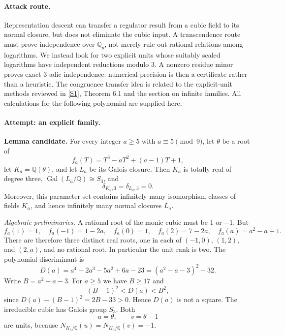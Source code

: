 \documentclass[11pt,a4paper]{article}
\newcommand{\Q}{\mathbb{Q}}
\newcommand{\sref}[2]{\hyperlink{source:#1:#2}{[S#2]}}
\numberwithin{equation}{section}
\begin{document}
\paragraph{Attack route.}
Representation descent can transfer a regulator result from a cubic field
to its normal closure, but does not eliminate the cubic input. A
transcendence route must prove independence over $\Q_p$, not merely rule out
rational relations among logarithms. We instead look for two explicit units
whose suitably scaled logarithms have independent reductions modulo $3$.
A nonzero residue minor proves exact $3$-adic independence: numerical
precision is then a certificate rather than a heuristic. The congruence
transfer idea is related to the explicit-unit methods reviewed in
\sref{statement}{1}, Theorem 6.1 and the section on infinite families. All
calculations for the following polynomial are supplied here.

\paragraph{Attempt: an explicit family.}
\textbf{Lemma candidate.} For every integer $a\ge5$ with $a\equiv5\pmod9$,
let $\theta$ be a root of
\begin{equation}\label{eq156-family}
 f_a(T)=T^3-aT^2+(a-1)T+1,
\end{equation}
let $K_a=\Q(\theta)$, and let $L_a$ be its Galois closure. Then $K_a$ is
totally real of degree three, $\operatorname{Gal}(L_a/\Q)\cong S_3$, and
\[
 \delta_{K_a,3}=\delta_{L_a,3}=0.
\]
Moreover, this parameter set contains infinitely many isomorphism classes
of fields $K_a$, and hence infinitely many normal closures $L_a$.

\textit{Algebraic preliminaries.} A rational root of the monic cubic must be
$1$ or $-1$. But
\[
 f_a(1)=1,\quad f_a(-1)=1-2a,\quad f_a(0)=1,\quad
 f_a(2)=7-2a,\quad f_a(a)=a^2-a+1.
\]
There are therefore three distinct real roots, one in each of
$(-1,0)$, $(1,2)$, and $(2,a)$, and no rational root. In particular the
unit rank is two. The polynomial discriminant is
\begin{equation}\label{eq156-discriminant}
 D(a)=a^4-2a^3-5a^2+6a-23=(a^2-a-3)^2-32.
\end{equation}
Write $B=a^2-a-3$. For $a\ge5$ we have $B\ge17$ and
\[
 (B-1)^2<D(a)<B^2,
\]
since $D(a)-(B-1)^2=2B-33>0$. Hence $D(a)$ is not a square. The
irreducible cubic has Galois group $S_3$. Both
\[
 u=\theta,\qquad v=\theta-1
\]
are units, because $N_{K_a/\Q}(u)=N_{K_a/\Q}(v)=-1$.
\end{document}
